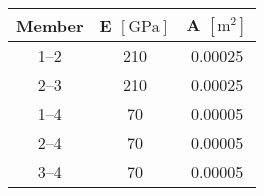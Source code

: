 \begin{tabular}{ccc}
    \toprule
    Member & \gls{E} $\left[\unit{\giga\pascal}\right]$ & \gls{A} $\left[\unit{\meter^2}\right]$ \\
    \midrule
    \numrange[range-phrase = --]{1}{2} & \num{210} & \num{0.00025} \\
    \numrange[range-phrase = --]{2}{3} & \num{210} & \num{0.00025} \\
    \numrange[range-phrase = --]{1}{4} & \num{70} & \num{0.00005} \\
    \numrange[range-phrase = --]{2}{4} & \num{70} & \num{0.00005} \\
    \numrange[range-phrase = --]{3}{4} & \num{70} & \num{0.00005} \\
    \bottomrule
\end{tabular}